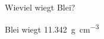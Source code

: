 \documentclass[addpoints,12pt,ngerman,answers]{exam}
\begin{document}
\begin{questions}
\question[5]
Wieviel wiegt Blei?

\begin{solution}
Blei wiegt \SI{11,342}{\gram\per \centi\meter^3} 
\end{solution}

\end{questions}
\end{document}
